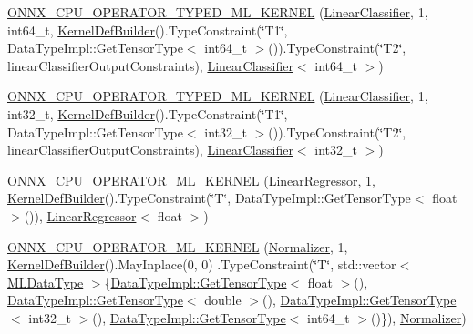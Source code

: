 \begin{DoxyCompactItemize}
\item 
\mbox{\hyperlink{namespaceonnxruntime_1_1ml_a8fc8fa43ae3e82630271c670befae4b9}{O\+N\+N\+X\+\_\+\+C\+P\+U\+\_\+\+O\+P\+E\+R\+A\+T\+O\+R\+\_\+\+T\+Y\+P\+E\+D\+\_\+\+M\+L\+\_\+\+K\+E\+R\+N\+EL}} (\mbox{\hyperlink{classonnxruntime_1_1ml_1_1LinearClassifier}{Linear\+Classifier}}, 1, int64\+\_\+t, \mbox{\hyperlink{classonnxruntime_1_1KernelDefBuilder}{Kernel\+Def\+Builder}}().Type\+Constraint(\char`\"{}T1\char`\"{}, Data\+Type\+Impl\+::\+Get\+Tensor\+Type$<$ int64\+\_\+t $>$()).Type\+Constraint(\char`\"{}T2\char`\"{}, linear\+Classifier\+Output\+Constraints), \mbox{\hyperlink{classonnxruntime_1_1ml_1_1LinearClassifier}{Linear\+Classifier}}$<$ int64\+\_\+t $>$)
\item 
\mbox{\hyperlink{namespaceonnxruntime_1_1ml_a1f9eb55a4e2974a358f075c0149af5ec}{O\+N\+N\+X\+\_\+\+C\+P\+U\+\_\+\+O\+P\+E\+R\+A\+T\+O\+R\+\_\+\+T\+Y\+P\+E\+D\+\_\+\+M\+L\+\_\+\+K\+E\+R\+N\+EL}} (\mbox{\hyperlink{classonnxruntime_1_1ml_1_1LinearClassifier}{Linear\+Classifier}}, 1, int32\+\_\+t, \mbox{\hyperlink{classonnxruntime_1_1KernelDefBuilder}{Kernel\+Def\+Builder}}().Type\+Constraint(\char`\"{}T1\char`\"{}, Data\+Type\+Impl\+::\+Get\+Tensor\+Type$<$ int32\+\_\+t $>$()).Type\+Constraint(\char`\"{}T2\char`\"{}, linear\+Classifier\+Output\+Constraints), \mbox{\hyperlink{classonnxruntime_1_1ml_1_1LinearClassifier}{Linear\+Classifier}}$<$ int32\+\_\+t $>$)
\item 
\mbox{\hyperlink{namespaceonnxruntime_1_1ml_ae25551d6b51f57889bfdeda0a0a92379}{O\+N\+N\+X\+\_\+\+C\+P\+U\+\_\+\+O\+P\+E\+R\+A\+T\+O\+R\+\_\+\+M\+L\+\_\+\+K\+E\+R\+N\+EL}} (\mbox{\hyperlink{classonnxruntime_1_1ml_1_1LinearRegressor}{Linear\+Regressor}}, 1, \mbox{\hyperlink{classonnxruntime_1_1KernelDefBuilder}{Kernel\+Def\+Builder}}().Type\+Constraint(\char`\"{}T\char`\"{}, Data\+Type\+Impl\+::\+Get\+Tensor\+Type$<$ float $>$()), \mbox{\hyperlink{classonnxruntime_1_1ml_1_1LinearRegressor}{Linear\+Regressor}}$<$ float $>$)
\item 
\mbox{\hyperlink{namespaceonnxruntime_1_1ml_a83b6fca67ac01d5a16a173611aae6a45}{O\+N\+N\+X\+\_\+\+C\+P\+U\+\_\+\+O\+P\+E\+R\+A\+T\+O\+R\+\_\+\+M\+L\+\_\+\+K\+E\+R\+N\+EL}} (\mbox{\hyperlink{classonnxruntime_1_1ml_1_1Normalizer}{Normalizer}}, 1, \mbox{\hyperlink{classonnxruntime_1_1KernelDefBuilder}{Kernel\+Def\+Builder}}().May\+Inplace(0, 0) .Type\+Constraint(\char`\"{}T\char`\"{}, std\+::vector$<$ \mbox{\hyperlink{namespaceonnxruntime_ad77d0a6e838ec7da5dc35fed5ee66b49}{M\+L\+Data\+Type}} $>$\{\mbox{\hyperlink{classonnxruntime_1_1DataTypeImpl_a7c4a6a7126bc7661eb67af6dfcfad1fb}{Data\+Type\+Impl\+::\+Get\+Tensor\+Type}}$<$ float $>$(), \mbox{\hyperlink{classonnxruntime_1_1DataTypeImpl_a7c4a6a7126bc7661eb67af6dfcfad1fb}{Data\+Type\+Impl\+::\+Get\+Tensor\+Type}}$<$ double $>$(), \mbox{\hyperlink{classonnxruntime_1_1DataTypeImpl_a7c4a6a7126bc7661eb67af6dfcfad1fb}{Data\+Type\+Impl\+::\+Get\+Tensor\+Type}}$<$ int32\+\_\+t $>$(), \mbox{\hyperlink{classonnxruntime_1_1DataTypeImpl_a7c4a6a7126bc7661eb67af6dfcfad1fb}{Data\+Type\+Impl\+::\+Get\+Tensor\+Type}}$<$ int64\+\_\+t $>$()\}), \mbox{\hyperlink{classonnxruntime_1_1ml_1_1Normalizer}{Normalizer}})

\end{DoxyCompactItemize}
